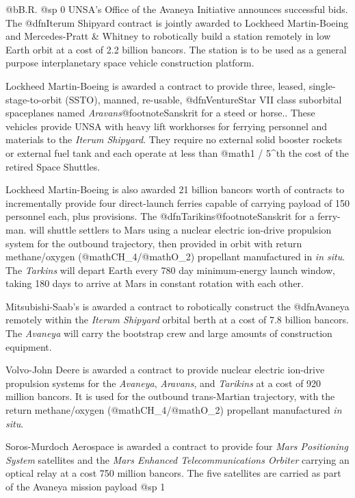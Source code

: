 @b{B.R.}
@sp 0
UNSA's Office of the Avaneya Initiative announces successful bids. The @dfn{Iterum Shipyard} contract is jointly awarded to Lockheed Martin-Boeing and Mercedes-Pratt & Whitney to robotically build a station remotely in low Earth orbit at a cost of 2.2 billion bancors. The station is to be used as a general purpose interplanetary space vehicle construction platform.

Lockheed Martin-Boeing is awarded a contract to provide three, leased, single-stage-to-orbit (SSTO), manned, re-usable, @dfn{VentureStar VII} class suborbital spaceplanes named {\it Aravans}@footnote{Sanskrit for a steed or horse.}. These vehicles provide UNSA with heavy lift workhorses for ferrying personnel and materials to the {\it Iterum Shipyard}. They require no external solid booster rockets or external fuel tank and each operate at less than @math{{1 / 5}^{th} } the cost of the retired Space Shuttles.

Lockheed Martin-Boeing is also awarded 21 billion bancors worth of contracts to incrementally provide four direct-launch ferries capable of carrying payload of 150 personnel each, plus provisions. The @dfn{Tarikins}@footnote{Sanskrit for a ferry-man.} will shuttle settlers to Mars using a nuclear electric ion-drive propulsion system for the outbound trajectory, then provided in orbit with return methane/oxygen (@math{CH_4}/@math{O_2}) propellant manufactured in {\it in situ}. The {\it Tarkins} will depart Earth every 780 day minimum-energy launch window, taking 180 days to arrive at Mars in constant rotation with each other.

Mitsubishi-Saab's is awarded a contract to robotically construct the @dfn{Avaneya} remotely within the {\it Iterum Shipyard} orbital berth at a cost of 7.8 billion bancors. The {\it Avaneya} will carry the bootstrap crew and large amounts of construction equipment.

Volvo-John Deere is awarded a contract to provide nuclear electric ion-drive propulsion systems for the {\it Avaneya}, {\it Aravans}, and {\it Tarikins} at a cost of 920 million bancors. It is used for the outbound trans-Martian trajectory, with the return methane/oxygen (@math{CH_4}/@math{O_2}) propellant manufactured {\it in situ}.

Soros-Murdoch Aerospace is awarded a contract to provide four {\it Mars Positioning System} satellites and the {\it Mars Enhanced Telecommunications Orbiter} carrying an optical relay at a cost 750 million bancors. The five satellites are carried as part of the Avaneya mission payload
@sp 1

